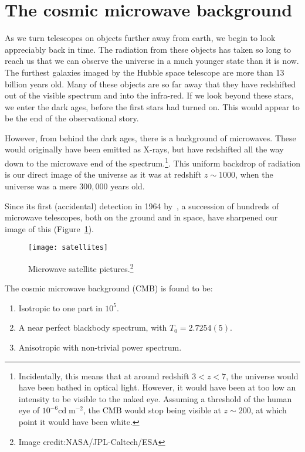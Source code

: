 \section{The cosmic microwave background}
As we turn telescopes on objects further away from earth, we begin to look appreciably back in time. The radiation from these objects has taken so long to reach us that we can observe the universe in a much younger state than it is now. The furthest galaxies imaged by the Hubble space telescope are more than 13 billion years old. Many of these objects are so far away that they have redshifted out of the visible spectrum and into the infra-red. If we look beyond these stars, we enter the dark ages, before the first stars had turned on. This would appear to be the end of the observational story.

However, from behind the dark ages, there is a background of microwaves. These would originally have been emitted as X-rays, but have redshifted all the way down to the microwave end of the spectrum.\footnote{Incidentally, this means that at around redshift $3<z<7$, the universe would have been bathed in optical light. However, it would have been at too low an intensity to be visible to the naked eye. Assuming a threshold of the human eye of $10^{-6}\mathrm{cd}\;\mathrm{m}^{-2}$, the CMB would stop being visible at $z\sim200$, at which point it would have been white.}. This uniform backdrop of radiation is our direct image of the universe as it was at redshift $z\sim1000$, when the universe was a mere $300,000$ years old.

Since its first (accidental) detection in 1964 by~\cite{PenziasWilson}, a succession of hundreds of microwave telescopes, both on the ground and in space, have sharpened our image of this (Figure~\ref{fig:cos:satellites}).
\begin{figure}
  \centering
  \texttt{[image: satellites]}
  \caption{Microwave satellite pictures.\protect\footnote{Image credit:NASA/JPL-Caltech/ESA}}\label{fig:cos:satellites}
\end{figure}
The cosmic microwave background (CMB) is found to be:
\begin{enumerate}
  \item Isotropic to one part in $10^{5}$.
  \item A near perfect blackbody spectrum, with $T_0=2.7254(5)$.
  \item Anisotropic with non-trivial power spectrum.
\end{enumerate}

